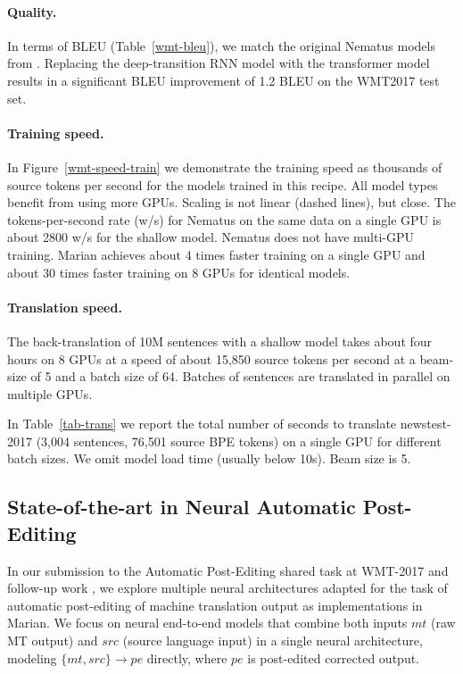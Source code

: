 \documentclass[11pt,a4paper]{article}
\begin{document}
  \paragraph{Quality.} In terms of BLEU (Table~\ref{wmt-bleu}), we match  the original Nematus models from . 
  Replacing the deep-transition RNN model with the transformer model results in a significant BLEU improvement of 1.2 BLEU on the WMT2017 test set. 

  \paragraph{Training speed.}

  In Figure~\ref{wmt-speed-train} we demonstrate the training speed as thousands of source tokens per second for the models trained in this recipe. All model types benefit from using more GPUs. Scaling is not linear (dashed lines), but close. The tokens-per-second rate (w/s) for Nematus on the same data on a single GPU is about 2800 w/s for the shallow model. Nematus does not have multi-GPU training. Marian achieves about 4 times faster training on a single GPU and about 30 times faster training on 8 GPUs for identical models.

  \paragraph{Translation speed.}

  The back-translation of 10M sentences with a shallow model takes about four hours on 8 GPUs at a speed of about 15,850 source tokens per second at a beam-size of 5 and a batch size of 64. Batches of sentences are translated in parallel on multiple GPUs. 

  In Table~\ref{tab-trans} we report the total number of seconds to translate newstest-2017 (3,004 sentences, 76,501 source BPE tokens) on a single GPU for different batch sizes. We omit model load time (usually below 10s). Beam size is 5.


  \subsection{State-of-the-art in Neural Automatic Post-Editing}
  In our submission to the Automatic Post-Editing shared task at WMT-2017 \cite{bojar-EtAl:2017:WMT1} and follow-up work \cite{junczysdowmunt-grundkiewicz:2017:WMT, I17-1013}, 
  we explore multiple neural architectures adapted for the task of automatic post-editing of machine translation output as implementations in Marian. We focus on neural end-to-end models that combine both inputs $mt$ (raw MT output) and $src$ (source language input) in a single neural architecture, modeling $\{mt,src\}\rightarrow pe$ directly, where $pe$ is post-edited corrected output.
\end{document}
